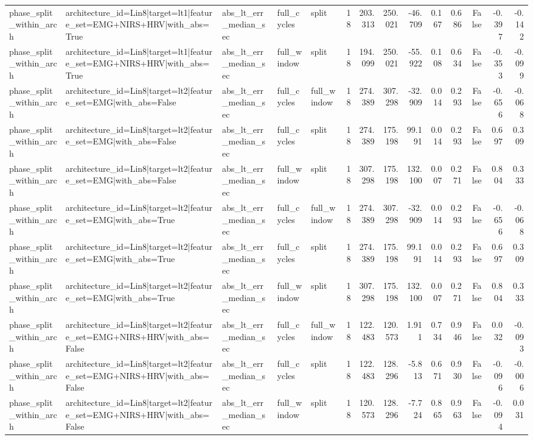 \begin{table}
\begin{tabular}{lllllrrrrrrrrr}
phase_split_within_arch & architecture_id=Lin8|target=lt1|feature_set=EMG+NIRS+HRV|with_abs=True & abs_lt_err_median_sec & full_cycles & split & 18 & 203.313 & 250.021 & -46.709 & 0.167 & 0.686 & False & -0.397 & -0.142 \\
phase_split_within_arch & architecture_id=Lin8|target=lt1|feature_set=EMG+NIRS+HRV|with_abs=True & abs_lt_err_median_sec & full_window & split & 18 & 194.099 & 250.021 & -55.922 & 0.108 & 0.634 & False & -0.353 & -0.099 \\
phase_split_within_arch & architecture_id=Lin8|target=lt2|feature_set=EMG|with_abs=False & abs_lt_err_median_sec & full_cycles & full_window & 18 & 274.389 & 307.298 & -32.909 & 0.014 & 0.293 & False & -0.656 & -0.068 \\
phase_split_within_arch & architecture_id=Lin8|target=lt2|feature_set=EMG|with_abs=False & abs_lt_err_median_sec & full_cycles & split & 18 & 274.389 & 175.198 & 99.191 & 0.014 & 0.293 & False & 0.697 & 0.309 \\
phase_split_within_arch & architecture_id=Lin8|target=lt2|feature_set=EMG|with_abs=False & abs_lt_err_median_sec & full_window & split & 18 & 307.298 & 175.198 & 132.100 & 0.007 & 0.271 & False & 0.804 & 0.333 \\
phase_split_within_arch & architecture_id=Lin8|target=lt2|feature_set=EMG|with_abs=True & abs_lt_err_median_sec & full_cycles & full_window & 18 & 274.389 & 307.298 & -32.909 & 0.014 & 0.293 & False & -0.656 & -0.068 \\
phase_split_within_arch & architecture_id=Lin8|target=lt2|feature_set=EMG|with_abs=True & abs_lt_err_median_sec & full_cycles & split & 18 & 274.389 & 175.198 & 99.191 & 0.014 & 0.293 & False & 0.697 & 0.309 \\
phase_split_within_arch & architecture_id=Lin8|target=lt2|feature_set=EMG|with_abs=True & abs_lt_err_median_sec & full_window & split & 18 & 307.298 & 175.198 & 132.100 & 0.007 & 0.271 & False & 0.804 & 0.333 \\
phase_split_within_arch & architecture_id=Lin8|target=lt2|feature_set=EMG+NIRS+HRV|with_abs=False & abs_lt_err_median_sec & full_cycles & full_window & 18 & 122.483 & 120.573 & 1.911 & 0.734 & 0.946 & False & 0.032 & -0.093 \\
phase_split_within_arch & architecture_id=Lin8|target=lt2|feature_set=EMG+NIRS+HRV|with_abs=False & abs_lt_err_median_sec & full_cycles & split & 18 & 122.483 & 128.296 & -5.813 & 0.671 & 0.930 & False & -0.096 & -0.006 \\
phase_split_within_arch & architecture_id=Lin8|target=lt2|feature_set=EMG+NIRS+HRV|with_abs=False & abs_lt_err_median_sec & full_window & split & 18 & 120.573 & 128.296 & -7.724 & 0.865 & 0.963 & False & -0.094 & 0.031 \\

\end{tabular}
\end{table}

